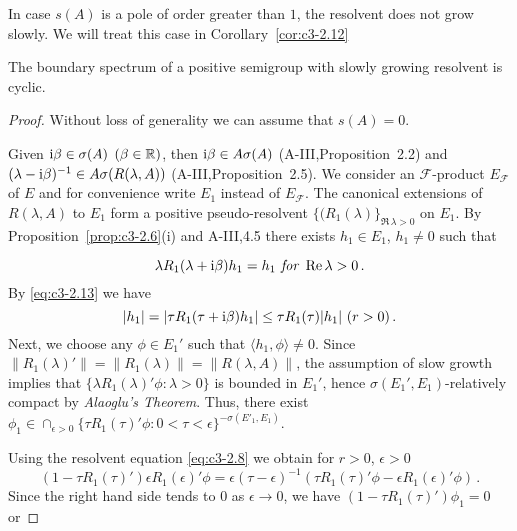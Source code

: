 In case $s(A)$ is a pole of order greater than $1$, the resolvent does not grow slowly.
We will treat this case in Corollary~\ref{cor:c3-2.12}
\begin{theorem}\label{thm:c3-2.10}
	The boundary spectrum of a positive semigroup with slowly growing resolvent is cyclic.
\end{theorem}

\begin{proof}
Without loss of generality we can assume that $s(A) = 0$.

Given $\mathrm{i}\beta \in \sigma(A)$ $(\beta \in \mathbb{R} )$, then $\mathrm{i}\beta \in A\sigma(A)$ (A-III,Proposition~2.2) and $(\lambda-\mathrm{i}\beta)^{-1} \in A\sigma(R(\lambda,A))$ (A-III,Proposition~2.5).
We consider an $\mathcal{F}$-product $E_{\mathcal{F}}$ of $E$ and for convenience write $E_{1}$ instead of $E_{\mathcal{F}}$.
The canonical extensions of $R(\lambda,A)$ to $E_{1}$ form a positive pseudo-resolvent $\{(R_{1}(\lambda)\}_{\Re\,\lambda>0}$ on $E_{1}$.
By Proposition~\ref{prop:c3-2.6}(i) and A-III,4.5 there exists $h_{1} \in E_{1}$, $h_{1} \neq 0$ such that

\begin{equation}\textstyle\label{eq:c3-2.16}
	\lambda R_{1}(\lambda+\mathrm{i}\beta)h_{1} = h_{1} \textit{ for }  \mathop{}\!\mathrm{Re}\,\lambda > 0\,.
\end{equation}
By \eqref{eq:c3-2.13} we have
\begin{equation}\label{eq:c3-2.17}\textstyle
	|h_{1}| = |\tau R_{1}(\tau+\mathrm{i}\beta)h_{1}| \leq \tau R_{1}(\tau)|h_{1}| \ (r > 0)\,.
\end{equation}
Next, we choose any $\phi \in E_{1}'$ such that $\langle  h_{1},\phi \rangle \neq 0$.
Since $\|R_{1}(\lambda)'\| = \|R_{1}(\lambda)\| = \|R(\lambda,A)\|$, the assumption of slow growth implies that $\{\lambda R_{1}(\lambda)'\phi : \lambda > 0\}$ is bounded in $E_{1}'$, hence $\sigma(E_{1}',E_{1})$-relatively compact by \emph{Alaoglu's Theorem}.
Thus, there exist $\phi_{1} \in \cap_{\epsilon>0}\{\tau R_{1}(\tau)'\phi : 0<\tau<\epsilon\}^{-\sigma(E'_1,E_1)}$.

Using the resolvent equation \eqref{eq:c3-2.8} we obtain for $r > 0$, $\epsilon > 0$
\[
(1 - \tau R_{1}(\tau)')\epsilon R_{1}(\epsilon)'\phi = \epsilon(\tau-\epsilon)^{-1}(\tau R_{1}(\tau)'\phi - \epsilon R_{1}(\epsilon)'\phi)\,.
\]
Since the right hand side tends to $0$ as $\epsilon \to 0$, we have $(1 - \tau R_{1}(\tau)')\phi_{1} = 0$ or


\end{proof}

